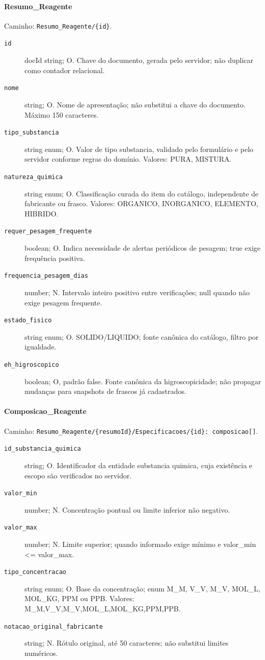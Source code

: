 \paragraph{Resumo\_Reagente}\mbox{}\par
Caminho: \texttt{Resumo\_Reagente/\{id\}}.
\begin{description}
\item[\texttt{id}] docId string; O. Chave do documento, gerada pelo servidor; não duplicar como contador relacional.
\item[\texttt{nome}] string; O. Nome de apresentação; não substitui a chave do documento. Máximo 150 caracteres.
\item[\texttt{tipo\_substancia}] string enum; O. Valor de tipo substancia, validado pelo formulário e pelo servidor conforme regras do domínio. Valores: PURA, MISTURA.
\item[\texttt{natureza\_quimica}] string enum; O. Classificação curada do item do catálogo, independente de fabricante ou frasco. Valores: ORGANICO, INORGANICO, ELEMENTO, HIBRIDO.
\item[\texttt{requer\_pesagem\_frequente}] boolean; O. Indica necessidade de alertas periódicos de pesagem; true exige frequência positiva.
\item[\texttt{frequencia\_pesagem\_dias}] number; N. Intervalo inteiro positivo entre verificações; null quando não exige pesagem frequente.
\item[\texttt{estado\_fisico}] string enum; O. SOLIDO/LIQUIDO; fonte canônica do catálogo, filtro por igualdade.
\item[\texttt{eh\_higroscopico}] boolean; O, padrão false. Fonte canônica da higroscopicidade; não propagar mudanças para snapshots de frascos já cadastrados.
\end{description}

\paragraph{Composicao\_Reagente}\mbox{}\par
Caminho: \texttt{Resumo\_Reagente/\{resumoId\}/Especificacoes/\{id\}: composicao[]}.
\begin{description}
\item[\texttt{id\_substancia\_quimica}] string; O. Identificador da entidade substancia quimica, cuja existência e escopo são verificados no servidor.
\item[\texttt{valor\_min}] number; N. Concentração pontual ou limite inferior não negativo.
\item[\texttt{valor\_max}] number; N. Limite superior; quando informado exige mínimo e valor\_min <= valor\_max.
\item[\texttt{tipo\_concentracao}] string enum; O. Base da concentração; enum M\_M, V\_V, M\_V, MOL\_L, MOL\_KG, PPM ou PPB. Valores: M\_M,V\_V,M\_V,MOL\_L,MOL\_KG,PPM,PPB.
\item[\texttt{notacao\_original\_fabricante}] string; N. Rótulo original, até 50 caracteres; não substitui limites numéricos.
\end{description}

